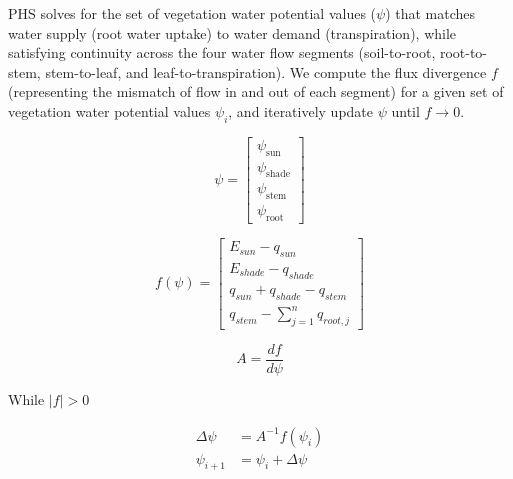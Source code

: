 \documentclass[draft,linenumbers]{agujournal}
\begin{document}
    PHS solves for the set of vegetation water potential values ($\psi$) that matches water supply
    (root water uptake) to water demand (transpiration), while satisfying continuity across the four water flow
    segments (soil-to-root, root-to-stem, stem-to-leaf, and leaf-to-transpiration). 
    We compute the flux divergence $f$ (representing the mismatch of flow in and out of each segment)
    for a given set of vegetation water potential values $\psi_i$, and iteratively update $\psi$ until $f\to0$.
    
    \begin{linenomath*}
    \begin{equation} 
    \psi = \left[
    \begin{array}{c}
    \psi_{\text{sun}} \\ 
    \psi_{\text{shade}} \\ 
    \psi_{\text{stem}} \\ 
    \psi_{\text{root}}            
    \end{array} \right]
    \end{equation}
    \end{linenomath*}
    
    \begin{linenomath*}
    \begin{equation}
    f\left(\psi\right) = \left[ 
    \begin{array}{c}
    E_{sun}-q_{sun}\\
    E_{shade}-q_{shade}\\
    q_{sun}+q_{shade}-q_{stem}\\
    q_{stem}-\sum_{j=1}^n{q_{root,j}}
    \end{array} \right]
    \end{equation}
    \end{linenomath*}
    
    \begin{linenomath*}
    \begin{equation}
    A = \dfrac{df}{d\psi}
    \end{equation}
    \end{linenomath*}    
    
    While $\left|f\right|>0$
    \begin{linenomath*}
    \begin{equation} \begin{aligned}
    \label{eq:iter}
    \Delta\psi &=A^{-1}f\left(\psi_i\right) \\
    \psi_{i+1}  &= \psi_i + \Delta\psi
    \end{aligned} \end{equation}
    \end{linenomath*}    
    
\end{document}
